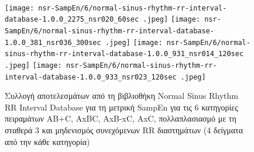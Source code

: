 \begin{figure}[h!]
    \\[\smallskipamount]
    \texttt{[image: nsr-SampEn/6/normal-sinus-rhythm-rr-interval-database-1.0.0\_2275\_nsr020\_60sec .jpeg]}\hfill
    \texttt{[image: nsr-SampEn/6/normal-sinus-rhythm-rr-interval-database-1.0.0\_381\_nsr036\_300sec .jpeg]}\hfill
    \texttt{[image: nsr-SampEn/6/normal-sinus-rhythm-rr-interval-database-1.0.0\_931\_nsr014\_120sec .jpeg]}\hfill
    \texttt{[image: nsr-SampEn/6/normal-sinus-rhythm-rr-interval-database-1.0.0\_933\_nsr023\_120sec .jpeg]}\hfill
    \caption{Συλλογή αποτελεσμάτων από τη βιβλιοθήκη \en Normal Sinus Rhythm RR Interval Database \gr για τη μετρική \en SampEn \gr για τις 6 κατηγορίες πειραμάτων \en AB+C, AxBC, AxB-xC, AxC, \gr πολλαπλασιασμό με τη σταθερά 3 και μηδενισμός συνεχόμενων \en RR \gr διαστημάτων (4 δείγματα από την κάθε κατηγορία)}
\end{figure}


